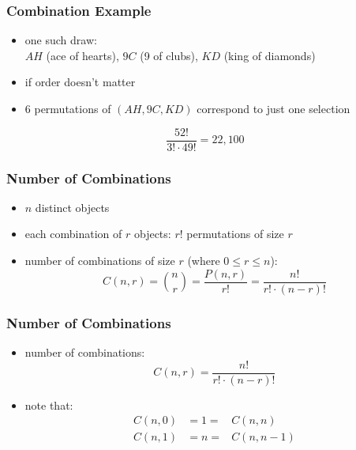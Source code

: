 \documentclass[dvipsnames]{beamer}
\begin{document}
\begin{frame}
  \frametitle{Combination Example}

  \begin{itemize}
    \item one such draw:\\
      $AH$ (ace of hearts), $9C$ (9 of clubs), $KD$ (king of diamonds)

    \pause
    \medskip
    \item if order doesn't matter
    \item 6 permutations of $(AH,9C,KD)$ correspond to just one selection
  \end{itemize}
  \begin{equation*}
    \frac{52!}{3! \cdot 49!} = 22,100
  \end{equation*}
\end{frame}

\begin{frame}
  \frametitle{Number of Combinations}

  \begin{itemize}
    \item $n$ distinct objects
    \item each combination of $r$ objects: $r!$ permutations of size $r$

    \pause
    \medskip
    \item number of combinations of size $r$ (where $0 \leq r \leq n$):
    \begin{equation*}
      C(n,r) = {n \choose r} = \frac{P(n,r)}{r!} = \frac{n!}{r! \cdot (n-r)!}
    \end{equation*}
  \end{itemize}
\end{frame}

\begin{frame}
  \frametitle{Number of Combinations}

  \begin{itemize}
    \item number of combinations:
    \begin{equation*}
      C(n,r) = \frac{n!}{r! \cdot (n-r)!}
    \end{equation*}

    \pause
    \item note that:
    \begin{eqnarray*}
      C(n,0) & = 1 = & C(n,n)\\
      C(n,1) & = n = & C(n,n-1)
    \end{eqnarray*}
  \end{itemize}
\end{frame}
\end{document}
